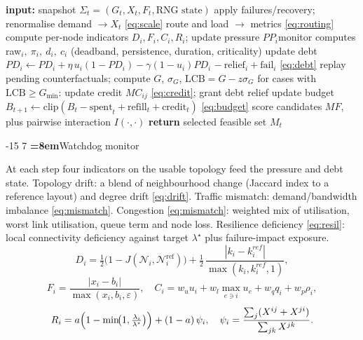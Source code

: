 \documentclass[runningheads]{llncs}
\makeatletter
\renewcommand\subsection{\@startsection{subsection}{2}{\z@}%
  {-15\p@ \@plus -4\p@ \@minus -4\p@}%
  {7\p@ \@plus 4\p@ \@minus 4\p@}%
  {\normalfont\normalsize\bfseries\boldmath\color{vitblue}%
   \rightskip=\z@ \@plus 8em\pretolerance=10000}}
\makeatother
\begin{document}
\begin{algorithm}[t]
\caption{P-LENS control loop (one step).}
\label{alg:plens}
\begin{algorithmic}[1]
\State \textbf{input:} snapshot $\Sigma_t = (G_t, X_t, F_t, \text{RNG state})$
\State apply failures/recovery; renormalise demand $\to X_t$ \eqref{eq:scale}
\State route and load $\to$ metrics \eqref{eq:routing}
\State compute per-node indicators $D_i, F_i, C_i, R_i$; update pressure $PP_i$\State monitor computes raw$_i,\ \pi_i,\ d_i,\ c_i$ (deadband, persistence, duration, criticality)
\State update debt $PD_i \gets PD_i + \eta\,u_i(1-PD_i) - \gamma(1-u_i)PD_i$
  $-\ \mathrm{relief}_i + \mathrm{fail}_i$ \eqref{eq:debt}
\State replay pending counterfactuals; compute $G$, $\sigma_G$,
$\text{LCB} = G - z\sigma_G$
\State for cases with $\text{LCB} \ge G_{\min}$: update credit $MC_{ij}$
  \eqref{eq:credit}; grant debt relief
\State update budget $B_{t+1} \gets \mathrm{clip}(B_t - \text{spent}_t +
\text{refill}_t + \text{credit}_t)$ \eqref{eq:budget}
\State score candidates $MF$, plus pairwise interaction $I(\cdot,\cdot)$
\State \textbf{return} selected feasible set $M_t$
\end{algorithmic}
\end{algorithm}

\subsection{Watchdog monitor}
\label{sec:monitor}

At each step four indicators on the usable topology feed the pressure and
debt state. Topology drift: a blend of neighbourhood change (Jaccard index
to a reference layout) and degree drift \eqref{eq:drift}. Traffic mismatch:
demand/bandwidth imbalance \eqref{eq:mismatch}. Congestion \eqref{eq:mismatch}:
weighted mix of utilisation, worst link utilisation, queue term and node
loss. Resilience deficiency \eqref{eq:resil}: local connectivity deficiency
against target $\lambda^\star$ plus failure-impact exposure.
\begin{equation}
D_i = \tfrac12\bigl(1 - J(\mathcal{N}_i, \mathcal{N}^{\text{ref}}_i)\bigr)
     + \tfrac12\,\frac{|k_i - k^{ref}_i|}{\max(k_i, k^{ref}_i, 1)},
\label{eq:drift}
\end{equation}
\begin{equation}
F_i = \frac{|x_i - b_i|}{\max(x_i, b_i, \varepsilon)},
\quad
C_i = w_u u_i + w_l \max_{e\ni i} u_e + w_q q_i + w_p \rho_i ,
\label{eq:mismatch}
\end{equation}
\begin{equation}
R_i = a\Bigl(1 - \min\!\bigl(1, \tfrac{\lambda_i}{\lambda^\star}\bigr)\Bigr) + (1-a)\,\psi_i,
\quad \psi_i = \frac{\sum_j (X^{ij}+X^{ji})}{\sum_{jk} X^{jk}} .
\label{eq:resil}
\end{equation}
\end{document}

